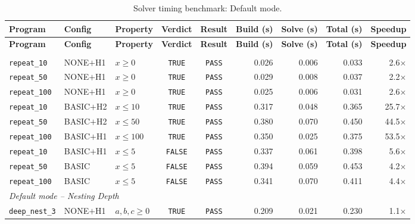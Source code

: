 {\small
\begin{longtable}{p{} p{} p{} c c r r r r}
\caption{Solver timing benchmark: Default mode.}
\label{tab:timing-default} \\
\toprule
\textbf{Program} & \textbf{Config} & \textbf{Property} & \textbf{Verdict} & \textbf{Result} & \textbf{Build (s)} & \textbf{Solve (s)} & \textbf{Total (s)} & \textbf{Speedup} \\
\midrule
\endfirsthead
\toprule
\textbf{Program} & \textbf{Config} & \textbf{Property} & \textbf{Verdict} & \textbf{Result} & \textbf{Build (s)} & \textbf{Solve (s)} & \textbf{Total (s)} & \textbf{Speedup} \\
\midrule
\endhead
\midrule
\endfoot
\bottomrule
\endlastfoot
\multicolumn{9}{l}{\textit{Default mode -- Loop Scaling}} \\
\midrule
\texttt{repeat\_10} & NONE$+$H1 & $x \geq 0$ & \texttt{TRUE} & \texttt{PASS} & 0.026 & 0.006 & 0.033 & 2.6$\times$ \\
\texttt{repeat\_50} & NONE$+$H1 & $x \geq 0$ & \texttt{TRUE} & \texttt{PASS} & 0.029 & 0.008 & 0.037 & 2.2$\times$ \\
\texttt{repeat\_100} & NONE$+$H1 & $x \geq 0$ & \texttt{TRUE} & \texttt{PASS} & 0.025 & 0.006 & 0.031 & 2.6$\times$ \\
\texttt{repeat\_10} & BASIC$+$H2 & $x \leq 10$ & \texttt{TRUE} & \texttt{PASS} & 0.317 & 0.048 & 0.365 & 25.7$\times$ \\
\texttt{repeat\_50} & BASIC$+$H2 & $x \leq 50$ & \texttt{TRUE} & \texttt{PASS} & 0.380 & 0.070 & 0.450 & 44.5$\times$ \\
\texttt{repeat\_100} & BASIC$+$H1 & $x \leq 100$ & \texttt{TRUE} & \texttt{PASS} & 0.350 & 0.025 & 0.375 & 53.5$\times$ \\
\texttt{repeat\_10} & BASIC$+$H1 & $x \leq 5$ & \texttt{FALSE} & \texttt{PASS} & 0.337 & 0.061 & 0.398 & 5.6$\times$ \\
\texttt{repeat\_50} & BASIC & $x \leq 5$ & \texttt{FALSE} & \texttt{PASS} & 0.394 & 0.059 & 0.453 & 4.2$\times$ \\
\texttt{repeat\_100} & BASIC & $x \leq 5$ & \texttt{FALSE} & \texttt{PASS} & 0.341 & 0.070 & 0.411 & 4.4$\times$ \\
\midrule
\multicolumn{9}{l}{\textit{Default mode -- Nesting Depth}} \\
\midrule
\texttt{deep\_nest\_3} & NONE$+$H1 & $a,b,c \geq 0$ & \texttt{TRUE} & \texttt{PASS} & 0.209 & 0.021 & 0.230 & 1.1$\times$ \\

\end{longtable}}
